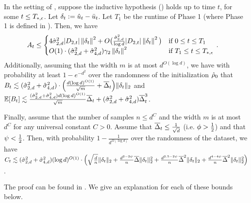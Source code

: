 \begin{lemma}[Bounds on $A_t, B_t, C_t$] \label{lemma:final_bounds_ABC}
In the setting of , suppose the inductive hypothesis () holds up to time $t$, for some $t \leq T_{*, \epsilon}$. Let $\delta_t := \hat{u}_t - \bar{u}_t$. Let $T_1$ be the runtime of Phase 1 (where Phase 1 is defined in ). Then, we have
\begin{align}
    A_t &\le \begin{cases} 4\hat{\sigma}_{2, d}^2|D_{2,t}|\left\lVert\delta_t\right\rVert^2 + O\big( \frac{\hat{\sigma}_{2, d}^2}{\log d}|D_{2,t}| \left\lVert\delta_t\right\rVert^2 \big) & \text{if } 0\le t \le T_1 \\
    O(1)\cdot (\hat{\sigma}_{2, d}^2 + \hat{\sigma}_{4, d}^2)\gamma_2 \left\lVert\delta_t\right\rVert^2 & \text{if } T_1\le t \le T_{*, \epsilon} 
\end{cases} \,.\label{eqn:at_bound}
\end{align}
Additionally, assuming that the width $m$ is at most $d^{O(\log d)}$, we have with probability at least $1 - e^{-d^2}$ over the randomness of the initialization ${\hat{\rho}}_0$ that $B_t \lesssim (\hat{\sigma}_{2, d}^2 + \hat{\sigma}_{4, d}^2) \cdot \Big(\frac{d (\log d)^{O(1)}}{\sqrt{m}} + \overline{\Delta}_t \Big) \|\delta_t\|_2$ and $\operatorname*{\mathbb{E}}[B_t] \lesssim \frac{(\hat{\sigma}_{2, d}^2 + \hat{\sigma}_{4, d}^2) d (\log d)^{O(1)}}{\sqrt{m}} \overline{\Delta}_t + (\hat{\sigma}_{2, d}^2 + \hat{\sigma}_{4, d}^2) \overline{\Delta}_t^3$. 

Finally, assume that the number of samples $n \leq d^C$ and the width $m$ is at most $d^C$ for any universal constant $C > 0$. Assume that $\overline{\Delta}_t \leq \frac{1}{\sqrt{d}}$ (i.e. $\phi > \frac{1}{2}$) and that $\psi < \frac{1}{2}$. Then, with probability $1 - \frac{1}{d^{\Omega(\log d)}}$ over the randomness of the dataset, we have $C_t \lesssim (\hat{\sigma}_{2, d}^2 + \hat{\sigma}_{4, d}^2) (\log d)^{O(1)} \cdot \Big(\sqrt{\frac{d}{n}} \|\delta_t\|_2 + \frac{d^{2 - 2\psi}}{n} \overline{\Delta} \|\delta_t\|_2^2 + \frac{d^{2.5 - 2\psi}}{n} \overline{\Delta}^2 \|\delta_t\|_2  + \frac{d^{4 - 4\psi}}{n} \overline{\Delta}^2 \|\delta_t\|_2^2 \Big)$.
\end{lemma}

The proof can be found in . We give an explanation for each of these bounds below.

